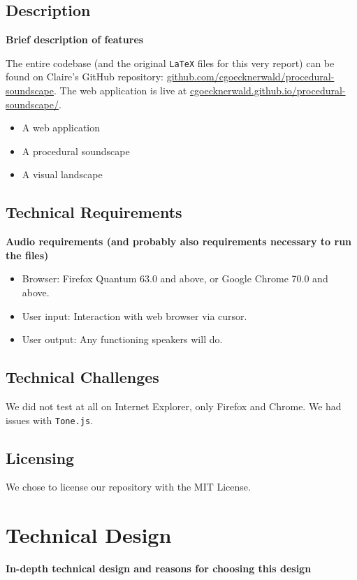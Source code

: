 \documentclass[12pt,a4paper]{article}
\newcommand{\code}{\texttt}
\newcommand{\lightcode}[1]{\colorbox{light-gray}{\texttt{#1}}}
\begin{document}
\subsection{Description}
\textbf{Brief description of features}

The entire codebase (and the original \code{LaTeX} files for this very report) can be found on Claire's GitHub repository: \href{https://github.com/cgoecknerwald/procedural-soundscape}{github.com/cgoecknerwald/procedural-soundscape}. The web application is live at \href{https://cgoecknerwald.github.io/procedural-soundscape/}{cgoecknerwald.github.io/procedural-soundscape/}.

\begin{itemize}
	\item A web application
	\item A procedural soundscape
	\item A visual landscape
\end{itemize}

\subsection{Technical Requirements}
\textbf{Audio requirements (and probably also requirements necessary to run the files)}

\begin{itemize}
	\item Browser: Firefox Quantum 63.0 and above, or Google Chrome 70.0 and above.
	\item User input: Interaction with web browser via cursor.
	\item User output: Any functioning speakers will do.
\end{itemize}

\subsection{Technical Challenges}
We did not test at all on Internet Explorer, only Firefox and Chrome. We had issues with \lightcode{Tone.js}.

\subsection{Licensing}
We chose to license our repository with the MIT License.


\pagebreak
\section{Technical Design}
\textbf{In-depth technical design and reasons for choosing this design}
\end{document}
